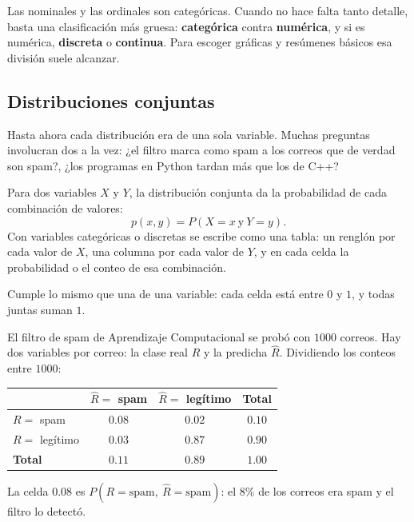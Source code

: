 \documentclass[11pt,letterpaper]{article}
\begin{document}
Las nominales y las ordinales son categóricas. Cuando no hace falta
tanto detalle, basta una clasificación más gruesa:
\textbf{categórica} contra \textbf{numérica}, y si es numérica,
\textbf{discreta} o \textbf{continua}. Para escoger gráficas y
resúmenes básicos esa división suele alcanzar.


\subsection*{Distribuciones conjuntas}

Hasta ahora cada distribución era de una sola variable. Muchas
preguntas involucran dos a la vez: ¿el filtro marca como spam a los
correos que de verdad son spam?, ¿los programas en Python tardan más
que los de C++?

\begin{definicion}
    Para dos variables $X$ y $Y$, la distribución conjunta da la
    probabilidad de cada combinación de valores:
    \[
        p(x, y) = P(X = x \ \text{y} \ Y = y) .
    \]
    Con variables categóricas o discretas se escribe como una tabla:
    un renglón por cada valor de $X$, una columna por cada valor de
    $Y$, y en cada celda la probabilidad o el conteo de esa
    combinación.
\end{definicion}

Cumple lo mismo que una de una variable: cada celda está entre $0$ y
$1$, y todas juntas suman $1$.

\begin{ejemplo}
    El filtro de spam de Aprendizaje Computacional se probó con $1000$
    correos. Hay dos variables por correo: la clase real $R$ y la
    predicha $\hat{R}$. Dividiendo los conteos entre $1000$:
    \begin{center}
    \begin{tabular}{lccc}
        \toprule
        & $\hat{R} = $ spam & $\hat{R} = $ legítimo & \textbf{Total} \\
        \midrule
        $R = $ spam     & $0.08$ & $0.02$ & $\mathbf{0.10}$ \\
        $R = $ legítimo & $0.03$ & $0.87$ & $\mathbf{0.90}$ \\
        \midrule
        \textbf{Total}  & $\mathbf{0.11}$ & $\mathbf{0.89}$
                        & $1.00$ \\
        \bottomrule
    \end{tabular}
    \end{center}
    La celda $0.08$ es $P(R = \text{spam},\ \hat{R} = \text{spam})$:
    el $8\%$ de los correos era spam y el filtro lo detectó.
\end{ejemplo}
\end{document}
